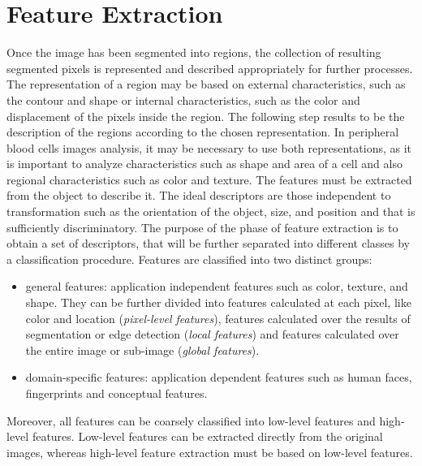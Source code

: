\chapter{Feature Extraction}
Once the image has been segmented into regions, the collection of resulting segmented pixels is represented and described appropriately for further processes. The representation of a region may be based on external characteristics, such as the contour and shape or internal characteristics, such as the color and displacement of the pixels inside the region. The following step results to be the description of the regions according to the chosen representation. In peripheral blood cells images analysis, it may be necessary to use both representations, as it is important to analyze characteristics such as shape and area of a cell and also regional characteristics such as color and texture. The features must be extracted from the object to describe it.
The ideal descriptors are those independent to transformation such as the orientation of the object, size, and position and that is sufficiently discriminatory. The purpose of the phase of feature extraction is to obtain a set of descriptors, that will be further separated into different classes by a classification procedure. Features are classified into two distinct groups:
\begin{itemize}
	\item general features: application independent features such as color, texture, and shape. They can be further divided into features calculated at each pixel, like color and location (\textit{pixel-level features}), features calculated over the results of segmentation or edge detection (\textit{local features}) and features calculated over the entire image or sub-image (\textit{global features}).
	\item domain-specific features: application dependent features such as human faces, fingerprints and conceptual features.
\end{itemize}
Moreover, all features can be coarsely classified into low-level features and high-level features. Low-level features can be extracted directly from the original images, whereas high-level feature extraction must be based on low-level features. 

